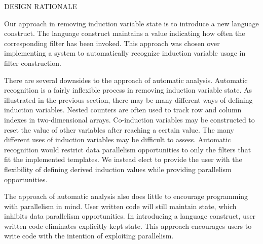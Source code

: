 {\large DESIGN RATIONALE}

Our approach in removing induction variable state is to introduce a new language construct.  The language construct maintains a value indicating how often the corresponding filter has been invoked.  This approach was chosen over implementing a system to automatically recognize induction variable usage in filter construction.

There are several downsides to the approach of automatic analysis.  Automatic recognition is a fairly inflexible process in removing induction variable state.  As illustrated in the previous section, there may be many different ways of defining induction variables.  Nested counters are often used to track row and column indexes in two-dimensional arrays.  Co-induction variables may be constructed to reset the value of other variables after reaching a certain value.  The many different uses of induction variables may be difficult to assess.  Automatic recognition would restrict data parallelism opportunities to only the filters that fit the implemented templates.  We instead elect to provide the user with the flexibility of defining derived induction values while providing parallelism opportunities.  

The approach of automatic analysis also does little to encourage programming with parallelism in mind.  User written code will still maintain state, which inhibits data parallelism opportunities.  In introducing a language construct, user written code eliminates explicitly kept state.  This approach encourages users to write code with the intention of exploiting parallelism.


